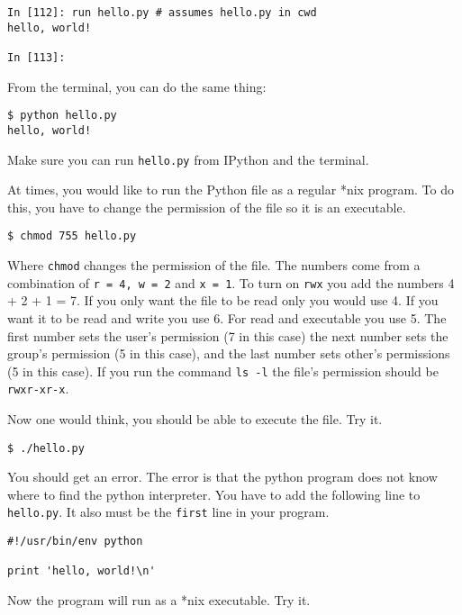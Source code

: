 \documentclass[12pt]{article}
\begin{document}
\begin{lstlisting}[style=bash]
In [112]: run hello.py # assumes hello.py in cwd 
hello, world!

In [113]:
\end{lstlisting}

From the terminal, you can do the same thing:

\begin{lstlisting}[style=bash]
$ python hello.py
hello, world!
\end{lstlisting}

Make sure you can run \texttt{hello.py} from IPython and the terminal.

At times, you would like to run the Python file as a regular *nix program. To do this, you have to change the permission of the file so it is an executable. 


\begin{lstlisting}[style=bash]
$ chmod 755 hello.py
\end{lstlisting}

Where \texttt{chmod} changes the permission of the file. The numbers come from a combination of \texttt{r = 4, w = 2} and \texttt{x = 1}. To turn on \texttt{rwx} you add the numbers 4 + 2 + 1 = 7. If you only want the file to be read only you would use 4. If you want it to be read and write you use 6. For read and executable you use 5. The first number sets the user's permission (7 in this case) the next number sets the group's permission (5 in this case), and the last number sets other's permissions (5 in this case). If you run the command \texttt{ls -l} the file's permission should be \texttt{rwxr-xr-x}.

Now one would think, you should be able to execute the file. Try it.

\begin{lstlisting}[style=bash]
$ ./hello.py
\end{lstlisting}

You should get an error. The error is that the python program does not know where to find the python interpreter. You have to add the following line to \texttt{hello.py}. It also must be the \texttt{first} line in your program.

\begin{lstlisting}[style=c]
#!/usr/bin/env python

print 'hello, world!\n'
\end{lstlisting}

Now the program will run as a *nix executable. Try it.
\end{document}
